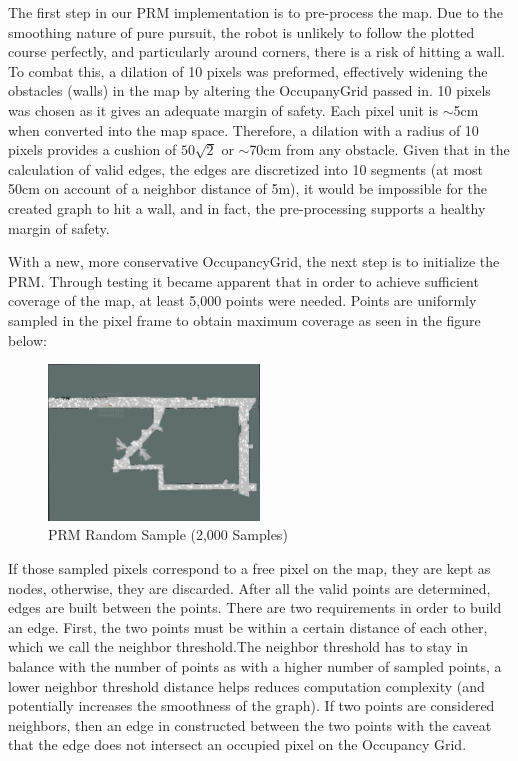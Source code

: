 \documentclass{article}
\begin{document}
The first step in our PRM implementation is to pre-process the map. Due to the smoothing nature of pure pursuit, the robot is unlikely to follow the plotted course perfectly, and particularly around corners, there is a risk of hitting a wall. To combat this, a dilation of 10 pixels was preformed, effectively widening the obstacles (walls) in the map by altering the OccupanyGrid passed in. 10 pixels was chosen as it gives an adequate margin of safety. Each pixel unit is $\sim$5cm when converted into the map space. Therefore, a dilation with a radius of 10 pixels provides a cushion of $50\sqrt{2}$ or $\sim$70cm from any obstacle. Given that in the calculation of valid edges, the edges are discretized into 10 segments (at most 50cm on account of a neighbor distance of 5m), it would be impossible for the created graph to hit a wall, and in fact, the pre-processing supports a healthy margin of safety.

With a new, more conservative OccupancyGrid, the next step is to initialize the PRM. Through testing it became apparent that in order to achieve sufficient coverage of the map, at least 5,000 points were needed. Points are uniformly sampled in the pixel frame to obtain maximum coverage as seen in the figure below:

\begin{figure}[htbp]
  \centering
  \includegraphics[width=0.5\textwidth]{lab6_points.png}
  \caption{PRM Random Sample (2,000 Samples)}
  \label{fig:example_png}
\end{figure}


If those sampled pixels correspond to a free pixel on the map, they are kept as nodes, otherwise, they are discarded. After all the valid points are determined, edges are built between the points. There are two requirements in order to build an edge. First, the two points must be within a certain distance of each other, which we call the neighbor threshold.The neighbor threshold has to stay in balance with the number of points as with a higher number of sampled points, a lower neighbor threshold distance helps reduces computation complexity (and potentially increases the smoothness of the graph). If two points are considered neighbors, then an edge in constructed between the two points with the caveat that the edge does not intersect an occupied pixel on the Occupancy Grid. 
\end{document}
